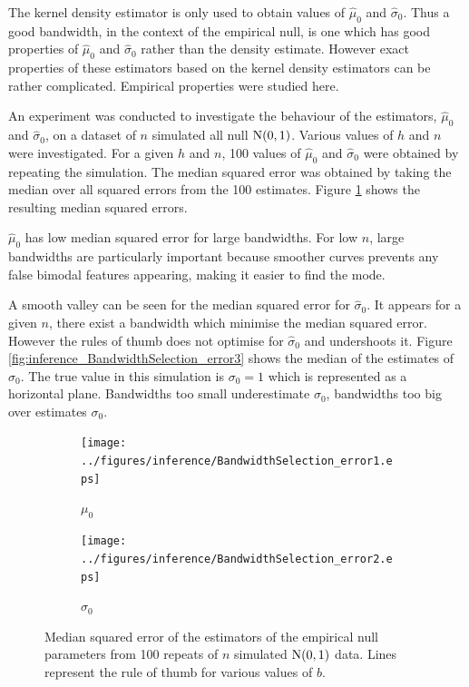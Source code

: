 The kernel density estimator is only used to obtain values of $\widehat{\mu}_0$ and $\widehat{\sigma}_0$. Thus a good bandwidth, in the context of the empirical null, is one which has good properties of $\widehat{\mu}_0$ and $\widehat{\sigma}_0$ rather than the density estimate. However exact properties of these estimators based on the kernel density estimators can be rather complicated. Empirical properties were studied here.

An experiment was conducted to investigate the behaviour of the estimators, $\widehat{\mu}_0$ and $\widehat{\sigma}_0$, on a dataset of $n$ simulated all null $\operatorname{N}(0,1)$. Various values of $h$ and $n$ were investigated. For a given $h$ and $n$, 100 values of $\widehat{\mu}_0$ and $\widehat{\sigma}_0$ were obtained by repeating the simulation. The median squared error was obtained by taking the median over all squared errors from the 100 estimates. Figure \ref{fig:inference_BandwidthSelection_error} shows the resulting median squared errors.

$\widehat{\mu}_0$ has low median squared error for large bandwidths. For low $n$, large bandwidths are particularly important because smoother curves prevents any false bimodal features appearing, making it easier to find the mode.

A smooth valley can be seen for the median squared error for $\widehat{\sigma}_0$. It appears for a given $n$, there exist a bandwidth which minimise the median squared error. However the rules of thumb does not optimise for $\widehat{\sigma}_0$ and undershoots it. Figure \ref{fig:inference_BandwidthSelection_error3} shows the median of the estimates of $\sigma_0$. The true value in this simulation is $\sigma_0=1$ which is represented as a horizontal plane. Bandwidths too small underestimate $\sigma_0$, bandwidths too big over estimates $\sigma_0$.

\begin{figure}
  \centering
  \begin{subfigure}[b]{0.49\textwidth}
      \texttt{[image: ../figures/inference/BandwidthSelection\_error1.eps]}
      \caption{$\mu_0$}
  \end{subfigure}
  \begin{subfigure}[b]{0.49\textwidth}
      \texttt{[image: ../figures/inference/BandwidthSelection\_error2.eps]}
      \caption{$\sigma_0$}
  \end{subfigure}
  \caption{Median squared error of the estimators of the empirical null parameters from 100 repeats of $n$ simulated $\operatorname{N}(0,1)$ data. Lines represent the rule of thumb for various values of $b$.}
  \label{fig:inference_BandwidthSelection_error}
\end{figure}

